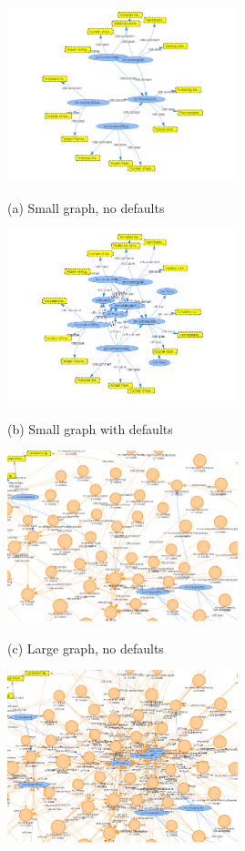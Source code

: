 \begin{figure}[htb]
\begin{minipage}[b]{.48\linewidth}
  \centering
  \centerline{\includegraphics[width=6.7cm]{img/no_defaults.png}}
  \centerline{(a) Small graph, no defaults}\medskip
  \vspace{.5cm}
\end{minipage}
\hfill
\begin{minipage}[b]{0.48\linewidth}
  \centering
  \centerline{\includegraphics[width=6.7cm]{img/with_defaults.png}}
  \centerline{(b) Small graph with defaults}\medskip
  \vspace{.5cm}
\end{minipage}
\begin{minipage}[b]{0.48\linewidth}
\centering
  \centerline{\includegraphics[width=6.7cm]{img/no_defaults1.png}}
  \centerline{(c) Large graph, no defaults}\medskip
\end{minipage}
\hfill
\begin{minipage}[b]{0.48\linewidth}
  \centering
  \centerline{\includegraphics[width=6.7cm]{img/with_defaults1.png}}

\end{minipage}
\end{figure}
